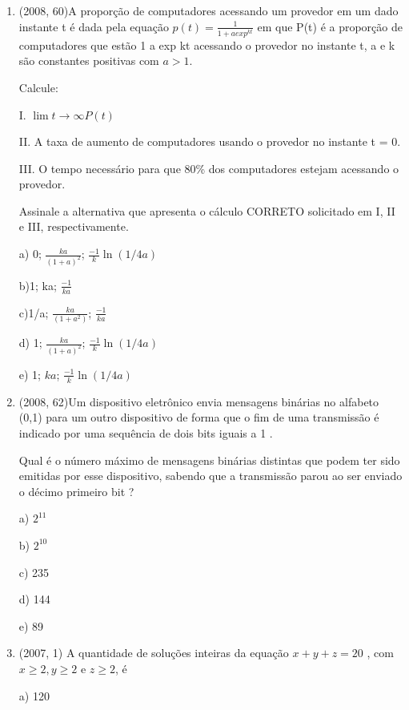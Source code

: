 \documentclass{article}
\begin{document}
\begin{enumerate}
\item(2008, 60)A proporção de computadores acessando um provedor em um dado instante t é dada pela equação $p(t)=\frac{1}{1+aexp^{kt}}$ em que P(t) é a proporção de computadores que estão 1 a exp kt acessando o provedor no instante t, a e k são constantes positivas com $a > 1$.

Calcule:

I. $\lim{t \to \infty} P (t)$

II. A taxa de aumento de computadores usando o provedor no instante t = 0. 

III. O tempo necessário para que 80\% dos computadores estejam acessando o provedor.

Assinale a alternativa que apresenta o cálculo CORRETO solicitado em I, II e III,
respectivamente.\newline

a) 0; $\frac{ka}{(1+a)^2}$; $\frac{-1}{k}\ln(1/4a)$

b)1; ka; $\frac{-1}{ka}$

c)1/a; $\frac{ka}{(1+a^2)}$; $\frac{-1}{ka}$

d) 1; $\frac{ka}{(1+a)^2}$; $\frac{-1}{k}\ln(1/4a)$

e) 1; $ka$; $\frac{-1}{k}\ln(1/4a)$\newline



\item(2008, 62)Um dispositivo eletrônico envia mensagens binárias no alfabeto (0,1) para um outro dispositivo de forma que o fim de uma transmissão é indicado por uma sequência de dois bits iguais a 1 .

Qual é o número máximo de mensagens binárias distintas que podem ter sido emitidas por esse dispositivo, sabendo que a transmissão parou ao ser enviado o décimo primeiro bit ?

a) $2^{11}$

b) $2^{10}$

c) 235

d) 144

e) 89 \newline










\item(2007, 1) A quantidade de soluções inteiras da equação $x + y + z = 20$ , com $x \geq 2, y \geq 2$ e $z \geq 2$, é

a) 120


\end{enumerate}
\end{document}

